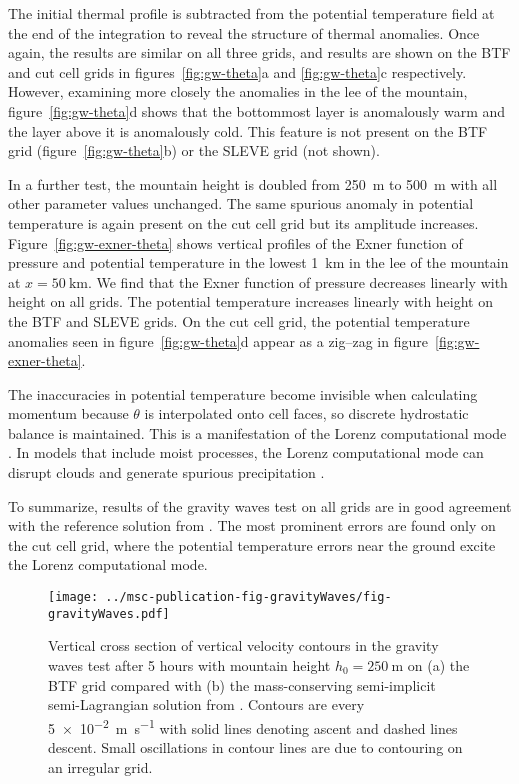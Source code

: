 \documentclass[twocol]{ametsoc}
\begin{document}
The initial thermal profile is subtracted from the potential temperature field at the end of the integration to reveal the structure of thermal anomalies.  Once again, the results are similar on all three grids, and results are shown on the BTF and cut cell grids in figures~\ref{fig:gw-theta}a and \ref{fig:gw-theta}c respectively.  However, examining more closely the anomalies in the lee of the mountain, figure~\ref{fig:gw-theta}d shows that the bottommost layer is anomalously warm and the layer above it is anomalously cold.  This feature is not present on the BTF grid (figure~\ref{fig:gw-theta}b) or the SLEVE grid (not shown).  

In a further test, the mountain height is doubled from \SI{250}{\meter} to \SI{500}{\meter} with all other parameter values unchanged.  The same spurious anomaly in potential temperature is again present on the cut cell grid but its amplitude increases.  Figure~\ref{fig:gw-exner-theta} shows vertical profiles of the Exner function of pressure and potential temperature in the lowest \SI{1}{\kilo\meter} in the lee of the mountain at \(x = \SI{50}{\kilo\meter}\).  We find that the Exner function of pressure decreases linearly with height on all grids.  The potential temperature increases linearly with height on the BTF and SLEVE grids.  On the cut cell grid, the potential temperature anomalies seen in figure~\ref{fig:gw-theta}d appear as a zig--zag in figure~\ref{fig:gw-exner-theta}.

The inaccuracies in potential temperature become invisible when calculating momentum because $\theta$ is interpolated onto cell faces, so discrete hydrostatic balance is maintained.  This is a manifestation of the Lorenz computational mode \citep{arakawa-konor1996,holdaway2013b}.  In models that include moist processes, the Lorenz computational mode can disrupt clouds and generate spurious precipitation \citep{hollingsworth1995}.

To summarize, results of the gravity waves test on all grids are in good agreement with the reference solution from \citet{melvin2010}.  The most prominent errors are found only on the cut cell grid, where the potential temperature errors near the ground excite the Lorenz computational mode.

\begin{figure}
	\centering
	\texttt{[image: ../msc-publication-fig-gravityWaves/fig-gravityWaves.pdf]}
%
	\caption{Vertical cross section of vertical velocity contours in the gravity waves test after 5 hours with mountain height $h_0 = \SI{250}{\meter}$ on (a) the BTF grid compared with (b) the mass-conserving semi-implicit semi-Lagrangian solution from \citet{melvin2010}.  Contours are every \SI{5e-2}{\meter\per\second} with solid lines denoting ascent and dashed lines descent.  Small oscillations in contour lines are due to contouring on an irregular grid.}
	\label{fig:gw-w}
\end{figure}
\end{document}

